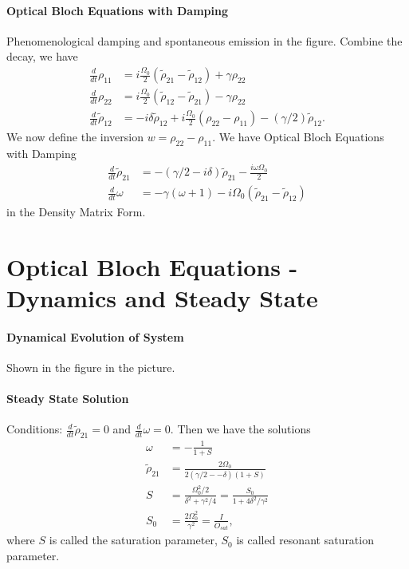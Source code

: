 \documentclass[../../note.tex]{subfiles}
\begin{document}
\paragraph{Optical Bloch Equations with Damping}
Phenomenological damping and spontaneous emission in the figure. Combine the decay, we have
\begin{align}
    \frac{d}{d t} \rho_{11}
    &= i \frac{\Omega_0}{2} \left(\tilde{\rho}_{21} - \tilde{\rho}_{12}\right) + \gamma \rho_{22} \\
    \frac{d}{d t} \rho_{22}
    &= i \frac{\Omega_0}{2} \left(\tilde{\rho}_{12} - \tilde{\rho}_{21}\right) -\gamma \rho_{22}\\
    \frac{d}{d t} \tilde{\rho}_{12}
    &= -i \delta \tilde{\rho}_{12} + i \frac{\Omega_0}{2} \left(\rho_{22} - \rho_{11}\right) - (\gamma/2)\tilde{\rho}_{12}.
\end{align}
We now define the inversion $w = \rho_{22} - \rho_{11}$. We have Optical Bloch Equations with Damping
\begin{align}
    \frac{d}{d t} \tilde{\rho}_{21}
    &= -\left(\gamma/2 - i \delta \right) \tilde{\rho}_{21} - \frac{i \omega \Omega_0}{2} \\
    \frac{d}{d t}\omega
    &= -\gamma \left(\omega + 1\right) - i \Omega_0 \left(\tilde{\rho}_{21} - \tilde{\rho}_{12}\right)
\end{align}
in the Density Matrix Form.

\section{Optical Bloch Equations - Dynamics and Steady State}
\paragraph{Dynamical Evolution of System}
Shown in the figure in the picture.

\paragraph{Steady State Solution}
Conditions: $\frac{d}{d t} \tilde{\rho}_{21} = 0$ and $\frac{d}{d t}\omega = 0$. Then we have the solutions
\begin{align}
    \omega
    &= - \frac{1}{1 + S} \\
    \tilde{\rho}_{21}
    &= \frac{2 \Omega_0}{2\left(\gamma/2 - -\delta \right)\left(1+S\right)} \\
    S
    &= \frac{\Omega_0^2/2}{\delta^2 + \gamma^2/4} = \frac{S_0}{1+4 \delta^2/\gamma^2} \\
    S_0
    &= \frac{2 \Omega_0^2}{\gamma^2} = \frac{I}{O_{sat}},
\end{align}
where $S$ is called the saturation parameter, $S_0$ is called resonant saturation parameter.
\end{document}
